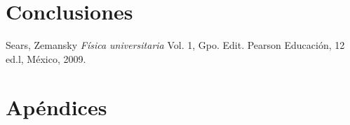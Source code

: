 \documentclass[DIV=calc, paper=a4, fontsize=11pt]{scrartcl}
\begin{document}
\begin{multicols}{2}
\section*{Conclusiones}
  
\begin{thebibliography}{99}
 Sears, Zemansky \emph{Física universitaria} Vol. 1, Gpo. Edit. Pearson Educación, 12 ed.l, México, 2009.

\end{thebibliography}

\section*{Apéndices}


\end{multicols}
\end{document}
